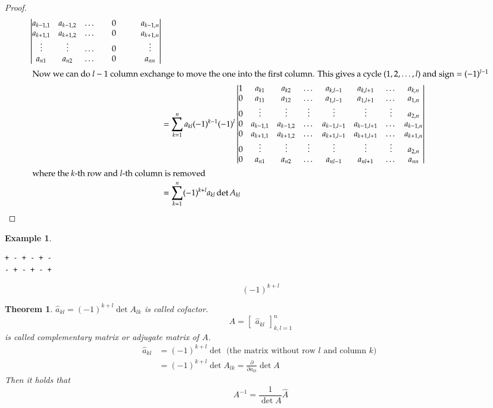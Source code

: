 \documentclass{article}
\newtheorem{theorem}{Theorem}  \numberwithin{theorem}{section}
\newtheorem{example}{Example}  \numberwithin{example}{section}
\DeclareMathOperator{\sign}{sign}
\begin{document}
\begin{proof}
\begin{align*}
\begin{vmatrix}
      a_{k-1,1} & a_{k-1,2} & \dots &           & 0 &           &       & a_{k-1,n} \\
      a_{k+1,1} & a_{k+1,2} & \dots &           & 0 &           &       & a_{k+1,n} \\
      \vdots & \vdots & \dots &           & 0 &           &       & \vdots \\
      a_{n1} & a_{n2} & \dots &           & 0 &           &       & a_{nn}
    \end{vmatrix} \\
    \intertext{
      Now we can do $l-1$ column exchange to move the one into the first column.
      This gives a cycle $(1, 2, \dots, l)$ and $\sign = (-1)^{l-1}$
    }
    &= \sum_{k=1}^n a_{kl} (-1)^{k-1} (-1)^l \begin{vmatrix}
      1 & a_{k1} & a_{k2} & \dots & a_{k,l-1} & a_{k,l+1} & \dots & a_{k,n} \\
      0 & a_{11} & a_{12} & \dots & a_{1,l-1} & a_{1,l+1} & \dots & a_{1,n} \\
      0 & \vdots & \vdots & \vdots& \vdots    & \vdots    & \vdots& a_{2,n} \\
      0 & a_{k-1,1} & a_{k-1,2} & \dots & a_{k-1,l-1} & a_{k-1,l+1} & \dots & a_{k-1,n} \\
      0 & a_{k+1,1} & a_{k+1,2} & \dots & a_{k+1,l-1} & a_{k+1,l+1} & \dots & a_{k+1,n} \\
      0 & \vdots & \vdots & \vdots& \vdots    & \vdots    & \vdots& a_{2,n} \\
      0 & a_{n1} & a_{n2} & \dots & a_{nl-1} & a_{nl+1} & \dots & a_{nn} \\
    \end{vmatrix} \\
    \intertext{
      where the $k$-th row and $l$-th column is removed
    }
    &= \sum_{k=1}^n (-1)^{k+l} a_{kl} \det{A_{kl}}
  \end{align*}
\end{proof}

\begin{example} %
  \begin{verbatim}
+ - + - + -
- + - + - +
\end{verbatim}
  \[ (-1)^{k+l} \]
\end{example}

\begin{theorem} %
  $\hat{a}_{kl} = (-1)^{k+l} \det{A_{lk}}$ is called \emph{cofactor}.
  \[ \hat{A} = \begin{bmatrix} \hat{a}_{kl} \end{bmatrix}_{k,l=1}^n \]
  is called \emph{complementary matrix} or \emph{adjugate matrix} of $A$.
  \begin{align*}
    \hat{a}_{kl}
    &= (-1)^{k+l} \det \text{ (the matrix without row $l$ and column $k$) } \\
    &= (-1)^{k+l} \det{A_{lk}} = \frac{\partial}{\partial a_{lk}} \det{A}
  \end{align*}
  Then it holds that
  \[ A^{-1} = \frac{1}{\det{A}} \hat{A} \]
\end{theorem}
\end{document}
